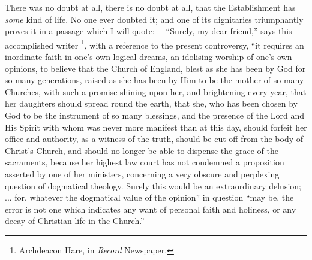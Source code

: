 There was no doubt at all, there is no doubt at all, that the
Establishment has \emph{some} kind of life. No one ever doubted it;
and one of its dignitaries triumphantly proves it in a passage which I
will quote:— ``Surely, my dear friend,'' says this
accomplished writer \footnote{Archdeacon Hare, in \emph{Record} Newspaper.},
with a reference to the present controversy, ``it requires an
inordinate faith in one's own logical dreams, an idolising worship of
one's own opinions, to believe that the Church of England, blest as
she has been by God for so many generations, raised as she has been by
Him to be the mother of so many Churches, with such a promise shining
upon her, and brightening every year, that her daughters should spread
round the earth, that she, who has been chosen by God to be the
instrument of so many blessings, and the presence of the Lord and His
Spirit with whom was never more manifest than at this day, should
forfeit her office and authority, as a witness of the truth, should be
cut off from the body of Christ's Church, and should no longer be able
to dispense the grace of the sacraments, because her highest law court
has not condemned a proposition asserted by one of her ministers,
concerning a very obscure and perplexing question of dogmatical
theology. Surely this would be an extraordinary delusion; ... for,
whatever the dogmatical value of the opinion'' in question
``may be, the error is not one which indicates any want of
personal faith and holiness, or any decay of Christian life in the
Church.''

